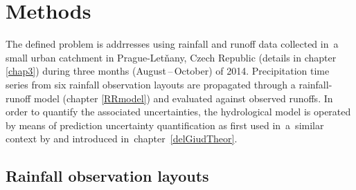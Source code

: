 \documentclass{ctuthesis}\usepackage[]{graphicx}\usepackage[]{color}
\begin{document}
 
\section{Methods} \label{pilotMnM}

The defined problem is addrresses using rainfall and runoff data collected in~a small urban catchment in Prague-Letňany, Czech Republic (details in chapter \ref{chap3}) during three months (August\,--\,October) of 2014. Precipitation time series from six rainfall observation layouts are propagated through a rainfall-runoff model (chapter \ref{RRmodel}) and evaluated against observed runoffs. In order to quantify the associated uncertainties, the hydrological model is operated by means of prediction uncertainty quantification as first used in~a~similar context by \cite{giudice2013improving} and introduced in~chapter~\ref{delGiudTheor}.


\subsection{Rainfall observation layouts} 
\end{document}
